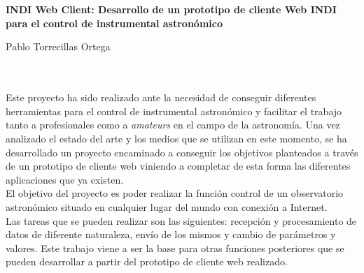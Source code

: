 \chapter*{}






\cleardoublepage
\thispagestyle{empty}

\begin{center}
{\large\bfseries INDI Web Client: Desarrollo de un prototipo de cliente Web INDI para el control de instrumental astronómico}\\
\end{center}
\begin{center}
Pablo Torrecillas Ortega\\
\end{center}

\\

\vspace{0.7cm}
\\

Este proyecto ha sido realizado ante la necesidad de conseguir diferentes herramientas para el control de instrumental astronómico y facilitar el trabajo tanto a profesionales como a \textit{amateurs} en el campo de la astronomía. Una vez analizado el estado del arte y los medios que se utilizan en este momento, se ha desarrollado un proyecto encaminado a conseguir los objetivos planteados a través de un prototipo de cliente web viniendo a completar de esta forma las diferentes aplicaciones que ya existen.\\

El objetivo del proyecto es poder realizar la función control de un observatorio astronómico situado en cualquier lugar del mundo con conexión a Internet.\\
Las tareas que se pueden realizar son las siguientes: recepción y procesamiento de datos de diferente naturaleza, envío de los mismos y cambio de parámetros y valores. Este trabajo viene a ser la base para otras funciones posteriores que se pueden desarrollar a partir del prototipo de cliente web realizado.\\

